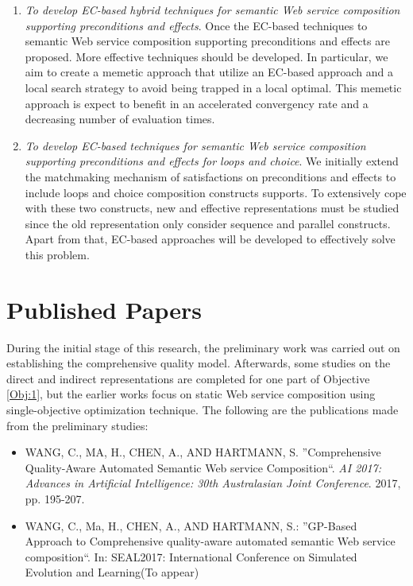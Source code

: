 \begin{enumerate}
\begin{enumerate}
  \item \emph{To develop EC-based hybrid techniques for semantic Web service composition supporting preconditions and effects}. Once the EC-based techniques to semantic Web service composition supporting preconditions and effects are proposed. More effective techniques should be developed. In particular, we aim to create a memetic approach that utilize an EC-based approach and a local search strategy to avoid being trapped in a local optimal. This memetic approach is expect to benefit in an accelerated convergency rate and a decreasing number of evaluation times.
    
   \item \emph{To develop EC-based techniques for semantic Web service composition supporting preconditions and effects for loops and choice}. We initially extend the matchmaking mechanism of satisfactions on preconditions and effects to include loops and choice composition constructs supports. To extensively cope with these two constructs, new and effective representations must be studied since the old representation only consider sequence and parallel constructs. Apart from that, EC-based approaches will be developed to effectively solve this problem.

 
 \end{enumerate}
 
\end{enumerate}

\section{Published Papers}

During the initial stage of this research, the preliminary work was carried out on establishing the comprehensive quality model.  Afterwards, some studies on the direct and indirect representations are completed for one part of Objective \ref{Obj:1}, but the earlier works focus on static Web service composition using single-objective optimization technique. The following are the publications made from the preliminary studies:

\begin{itemize}
 \item WANG, C., MA, H., CHEN, A., AND HARTMANN, S. ''Comprehensive Quality-Aware Automated Semantic Web service Composition``. \textit{AI 2017: Advances in Artificial Intelligence: 30th Australasian Joint Conference}. 2017, pp. 195-207.
 \item WANG, C., Ma, H., CHEN, A., AND HARTMANN, S.: ''GP-Based Approach to Comprehensive quality-aware automated semantic Web service composition``. In: SEAL2017: International Conference on Simulated Evolution and Learning(To appear)
\end{itemize}


